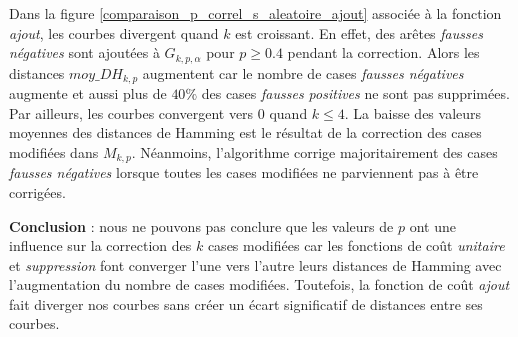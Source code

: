 Dans la figure \ref{comparaison_p_correl_s_aleatoire_ajout} associ\'ee \`a la fonction {\em ajout}, les courbes divergent quand $k$ est croissant.
En effet, des ar\^etes {\em fausses n\'egatives}  sont ajout\'ees \`a $G_{k,p,\alpha}$ pour $p \ge 0.4$ pendant la correction. Alors les distances $moy\_DH_{k,p}$ augmentent car le nombre de cases  {\em fausses n\'egatives} augmente et aussi plus de  $40\%$ des cases {\em fausses positives} ne sont pas supprim\'ees.  
Par ailleurs, les courbes convergent vers $0$ quand $k \le 4$. La baisse des valeurs moyennes des distances de Hamming est le r\'esultat de la correction des cases modifi\'ees dans $M_{k,p}$. N\'eanmoins, l'algorithme corrige majoritairement des cases {\em fausses n\'egatives} lorsque toutes les cases modifi\'ees ne parviennent pas \`a \^etre corrig\'ees. 
\newline

{\bf Conclusion} : nous ne pouvons pas conclure que les valeurs de $p$ ont une influence sur la correction des $k$ cases modifi\'ees car les fonctions de co\^ut {\em unitaire} et {\em suppression} font converger l'une vers l'autre leurs distances de Hamming avec l'augmentation du nombre de cases modifi\'ees. Toutefois, la fonction de co\^ut {\em ajout} fait diverger nos courbes sans cr\'eer un \'ecart significatif de distances entre ses courbes. 



